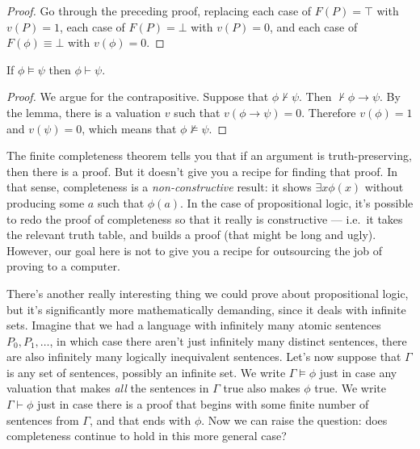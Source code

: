 \begin{proof} Go through the preceding proof, replacing each case of
  $F(P)=\top$ with $v(P)=1$, each case of $F(P)=\bot$ with $v(P)=0$,
  and each case of $F(\phi )\equiv \bot$ with $v(\phi
  )=0$.  \end{proof}

\begin{fct} If $\phi\vDash\psi$ then $\phi\vdash\psi$.  \end{fct}

\begin{proof} We argue for the contrapositive.  Suppose that
  $\phi\not\vdash\psi$.  Then \mbox{$\not\vdash \phi\to\psi$}.  By the
  lemma, there is a valuation $v$ such that $v(\phi\to\psi )=0$.
  Therefore $v(\phi )=1$ and $v(\psi )=0$, which means that
  $\phi\not\vDash\psi$. \end{proof}

The finite completeness theorem tells you that if an argument is
truth-preserving, then there is a proof.  But it doesn't give you a
recipe for finding that proof.  In that sense, completeness is a {\it
  non-constructive} result: it shows $\exists x\phi (x)$ without
producing some $a$ such that $\phi (a)$.  In the case of propositional
logic, it's possible to redo the proof of completeness so that it
really is constructive --- i.e.\ it takes the relevant truth table, and
builds a proof (that might be long and ugly).  However, our goal here
is not to give you a recipe for outsourcing the job of proving to a
computer.

There's another really interesting thing we could prove about
propositional logic, but it's significantly more mathematically
demanding, since it deals with infinite sets.  Imagine that we had a
language with infinitely many atomic sentences $P_0,P_1,\dots $, in
which case there aren't just infinitely many distinct sentences, there
are also infinitely many logically inequivalent sentences.  Let's now
suppose that $\Gamma$ is any set of sentences, possibly an infinite
set.  We write $\Gamma\vDash\phi$ just in case any valuation that
makes {\it all} the sentences in $\Gamma$ true also makes $\phi$ true.
We write $\Gamma\vdash\phi$ just in case there is a proof that begins
with some finite number of sentences from $\Gamma$, and that ends with
$\phi$.  Now we can raise the question: does completeness continue to
hold in this more general case?

